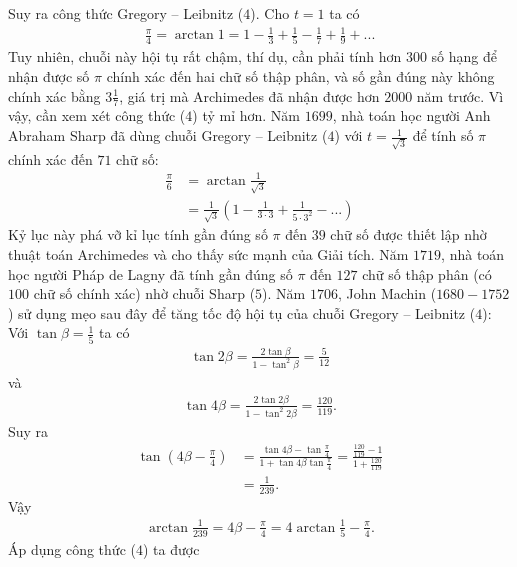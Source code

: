 \begin{multicols}{2}
	Suy ra công thức Gregory -- Leibnitz ($4$).
	\vskip 0.1cm 
	Cho $t = 1$  ta có
	\begin{align*}
		\frac{\pi }{4} = \arctan 1 = 1 - \frac{1}{3} + \frac{1}{5} - \frac{1}{7} + \frac{1}{9} + ...
	\end{align*}
	Tuy nhiên, chuỗi này hội tụ rất chậm, thí dụ, cần phải tính hơn $300$ số hạng để nhận được số $\pi$ chính xác đến hai chữ số thập phân, và số gần đúng này không chính xác bằng $3\frac{1}{7}$,  giá trị mà Archimedes đã nhận được hơn $2000$ năm trước.
	\vskip 0.1cm
	Vì vậy, cần xem xét công thức ($4$) tỷ mỉ hơn.
	\vskip 0.1cm
	Năm $1699$, nhà toán học người Anh Abraham Sharp đã dùng chuỗi Gregory -- Leibnitz ($4$) với $t = \frac{1}{\sqrt{3}}$ để tính số $\pi$ chính xác đến $71$ chữ số:
	\begin{align*}
		\frac{\pi }{6} &= \arctan \frac{1}{{\sqrt 3 }} \\
		&= \frac{1}{{\sqrt 3 }}\left( {1 - \frac{1}{{3 \cdot 3}} + \frac{1}{{5 \cdot {3^2}}} - ...} \right) \tag{$5$}
	\end{align*}
	Kỷ lục này phá vỡ kỉ lục tính gần đúng số $\pi$ đến $39$ chữ số được thiết lập nhờ thuật toán Archimedes và cho thấy sức mạnh của Giải tích.   
	\vskip 0.1cm
	Năm $1719$, nhà toán học người Pháp de Lagny đã tính gần đúng số $\pi$ đến $127$ chữ số thập phân (có $100$ chữ số chính xác) nhờ chuỗi Sharp ($5$).
	\vskip 0.1cm 
	Năm $1706$, John Machin ($1680-1752$) sử dụng mẹo sau đây để tăng tốc độ hội tụ của chuỗi Gregory -- Leibnitz ($4$): Với $\tan \beta = \frac{1}{5}$ ta có 
	\begin{align*}
		\tan 2\beta  = \frac{{2\tan \beta }}{{1 - {{\tan }^2}\beta }} = \frac{5}{{12}}
	\end{align*}
	và 
	\begin{align*}
		\tan 4\beta  = \frac{{2\tan 2\beta }}{{1 - {{\tan }^2}2\beta }} = \frac{{120}}{{119}}.
	\end{align*}
	Suy ra 
	\begin{align*}
		\tan \left( {4\beta  - \frac{\pi }{4}} \right) &= \frac{{\tan 4\beta  - \tan \frac{\pi }{4}}}{{1 + \tan 4\beta \tan \frac{\pi }{4}}} = \frac{{\frac{{120}}{{119}} - 1}}{{1 + \frac{{120}}{{119}}}} \\
		&= \frac{1}{{239}}.
	\end{align*}
	Vậy 
	\begin{align*}
		\arctan \frac{1}{{239}} = 4\beta  - \frac{\pi }{4} = 4\arctan \frac{1}{5} - \frac{\pi }{4}.
	\end{align*}
	Áp dụng công thức ($4$) ta được
	\begin{align*}

\end{align*}
\end{multicols}

